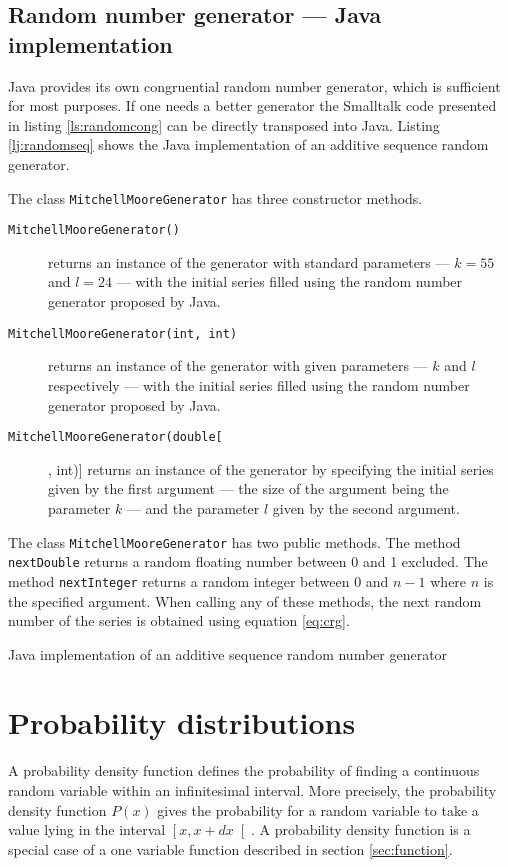 \documentclass[twoside]{book}
\begin{document}
\subsection{Random number generator --- Java implementation}
 Java provides its own
congruential random number generator, which is sufficient for most
purposes. If one needs a better generator the Smalltalk code
presented in listing \ref{ls:randomcong} can be directly
transposed into Java. Listing \ref{lj:randomseq} shows the Java
implementation of an additive sequence random generator.

\noindent The class {\tt MitchellMooreGenerator} has three
constructor methods.
\begin{description}
  \item[\tt MitchellMooreGenerator()] returns an instance of the
  generator with standard parameters --- $k=55$ and $l=24$ ---
  with the initial series filled using the random number generator
  proposed by Java.
  \item[\tt MitchellMooreGenerator(int, int)] returns an instance of the
  generator with given parameters --- $k$ and $l$ respectively ---
  with the initial series filled using the random number generator
  proposed by Java.
  \item[\tt MitchellMooreGenerator(double[], int)] returns an
  instance of the generator by specifying the initial series given by the
  first argument --- the size of the argument being the parameter $k$
  --- and the parameter $l$ given by the second argument.
\end{description}
\noindent The class {\tt MitchellMooreGenerator} has two public
methods. The method {\tt nextDouble} returns a random floating
number between 0 and 1 excluded. The method {\tt nextInteger}
returns a random integer between 0 and $n-1$ where $n$ is the
specified argument. When calling any of these methods, the next
random number of the series is obtained using equation
\ref{eq:crg}.

\begin{listing} Java implementation of an additive sequence random number generator
\label{lj:randomseq}

\end{listing}

\section{Probability distributions}
\label{sec:probdistr}A probability density function defines the
probability of finding a continuous random variable within an
infinitesimal interval. More precisely, the probability density
function $P\left(x\right)$ gives the probability for a random
variable to take a value lying in the interval
$\left[x,x+dx\right[$. A probability density function is a special
case of a one variable function described in section
\ref{sec:function}.
\end{document}

